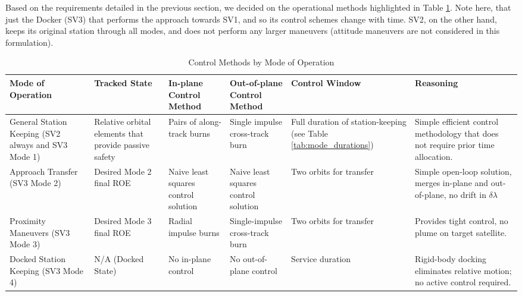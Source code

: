 Based on the requirements detailed in the previous section, we decided on the operational methods highlighted in Table \ref{tab:mode_control_methods}. Note here, that just the Docker (SV3) that performs the approach towards SV1, and so its control schemes change with time. SV2, on the other hand, keeps its original station through all modes, and does not perform any larger maneuvers (attitude maneuvers are not considered in this formulation).


\begin{table}[H]
    \centering
    \caption{Control Methods by Mode of Operation}
    \renewcommand{\arraystretch}{1.3}

    \begin{tabularx}{\textwidth}{|>{\raggedright\arraybackslash}p{}|%
                                      >{\raggedright\arraybackslash}p{}|%
                                      >{\raggedright\arraybackslash}p{}|%
                                      >{\raggedright\arraybackslash}p{}|%
                                      >{\raggedright\arraybackslash}p{}|%
                                      >{\raggedright\arraybackslash}X|}
        \rowcolor{lightgray}
        \hline
        \textbf{Mode of Operation} & \textbf{Tracked State} & \textbf{In-plane Control Method} & \textbf{Out-of-plane Control Method} & \textbf{Control Window} & \textbf{Reasoning} \\
        \hline
        General Station Keeping (SV2 always and SV3 Mode 1) & Relative orbital elements that provide passive safety & Pairs of along-track burns & Single impulse cross-track burn & Full duration of station-keeping (see Table \ref{tab:mode_durations}) & Simple efficient control methodology that does not require prior time allocation. \\
        \hline
        Approach Transfer (SV3 Mode 2) & Desired Mode 2 final ROE & Naive least squares control solution & Naive least squares control solution & Two orbits for transfer & Simple open-loop solution, merges in-plane and out-of-plane, no drift in $\delta \lambda$ \\
        \hline
        Proximity Maneuvers (SV3 Mode 3) & Desired Mode 3 final ROE & Radial impulse burns & Single-impulse cross-track burn & Two orbits for transfer & Provides tight control, no plume on target satellite. \\
        \hline
        Docked Station Keeping (SV3 Mode 4) & N/A (Docked State) & No in-plane control & No out-of-plane control & Service duration & Rigid-body docking eliminates relative motion; no active control required. \\
        \hline
    \end{tabularx}
    \label{tab:mode_control_methods}
\end{table}



